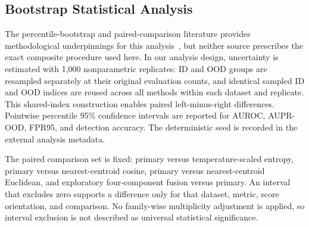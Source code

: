 \subsection{Bootstrap Statistical Analysis}

The percentile-bootstrap and paired-comparison literature provides methodological underpinnings for this analysis~\cite{efron1993bootstrap,dietterich1998approximate}, but neither source prescribes the exact composite procedure used here. In our analysis design, uncertainty is estimated with 1,000 nonparametric replicates: ID and OOD groups are resampled separately at their original evaluation counts, and identical sampled ID and OOD indices are reused across all methods within each dataset and replicate. This shared-index construction enables paired left-minus-right differences. Pointwise percentile 95\% confidence intervals are reported for AUROC, AUPR-OOD, FPR95, and detection accuracy. The deterministic seed is recorded in the external analysis metadata.

The paired comparison set is fixed: primary versus temperature-scaled entropy, primary versus nearest-centroid cosine, primary versus nearest-centroid Euclidean, and exploratory four-component fusion versus primary. An interval that excludes zero supports a difference only for that dataset, metric, score orientation, and comparison. No family-wise multiplicity adjustment is applied, so interval exclusion is not described as universal statistical significance.
